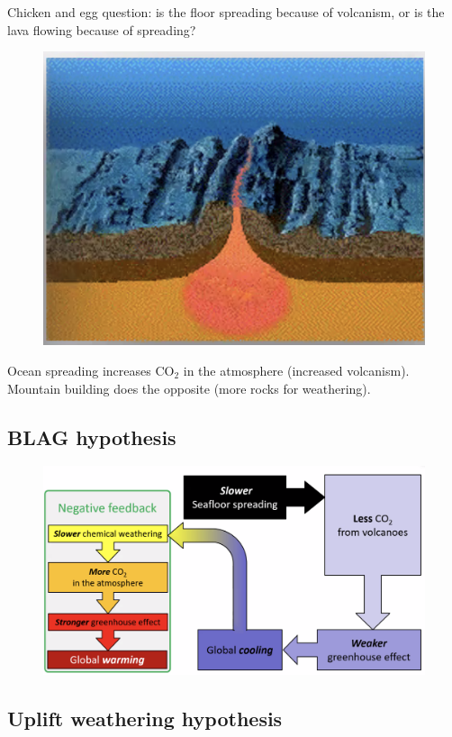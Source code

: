 Chicken and egg question: is the floor spreading because of volcanism, or is
the lava flowing because of spreading?

\begin{figure}[H]
    \centering
    \includegraphics[width=0.5\linewidth]{content/img/ocean_floor_spreading.png}
\end{figure}

Ocean spreading increases CO$_2$ in the atmosphere (increased volcanism).
Mountain building does the opposite (more rocks for weathering).

\subsection{BLAG hypothesis}

\begin{figure}[H]
    \centering
    \includegraphics[width=\linewidth]{content/img/blag.png}
\end{figure}

\subsection{Uplift weathering hypothesis}

